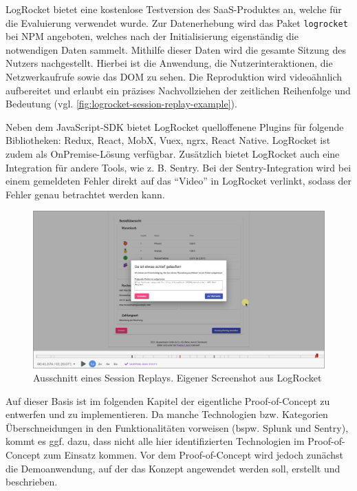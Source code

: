 LogRocket bietet eine kostenlose Testversion des SaaS-Produktes an, welche für die Evaluierung verwendet wurde. Zur Datenerhebung wird das Paket \texttt{logrocket} bei NPM \cite{NPM} angeboten, welches nach der Initialisierung eigenständig die notwendigen Daten sammelt. Mithilfe dieser Daten wird die gesamte Sitzung des Nutzers nachgestellt. Hierbei ist die Anwendung, die Nutzerinteraktionen, die Netzwerkaufrufe sowie das DOM zu sehen. Die Reproduktion wird videoähnlich aufbereitet und erlaubt ein präzises Nachvollziehen der zeitlichen Reihenfolge und Bedeutung (vgl. \autoref{fig:logrocket-session-replay-example}).

Neben dem JavaScript-SDK bietet LogRocket quelloffenene Plugins für folgende Bibliotheken: Redux, React, MobX, Vuex, ngrx, React Native. LogRocket ist zudem als OnPremise-Lösung verfügbar. Zusätzlich bietet LogRocket auch eine Integration für andere Tools, wie z. B. Sentry. Bei der Sentry-Integration wird bei einem gemeldeten Fehler direkt auf das \enquote{Video} in LogRocket verlinkt, sodass der Fehler genau betrachtet werden kann.

\begin{figure}[H]
	\centering
	\includegraphics[width=\linewidth]{img/03_methoden/logrocket_session-replay-example-cropped.png}
	\caption{Ausschnitt eines Session Replays. Eigener Screenshot aus LogRocket}
	\label{fig:logrocket-session-replay-example}
\end{figure}

\vspace{\baselineskip}

Auf dieser Basis ist im folgenden Kapitel der eigentliche Proof-of-Concept zu entwerfen und zu implementieren. Da manche Technologien bzw. Kategorien Überschneidungen in den Funktionalitäten vorweisen (bspw. Splunk und Sentry), kommt es ggf. dazu, dass nicht alle hier identifizierten Technologien im Proof-of-Concept zum Einsatz kommen. Vor dem Proof-of-Concept wird jedoch zunächst die Demoanwendung, auf der das Konzept angewendet werden soll, erstellt und beschrieben.